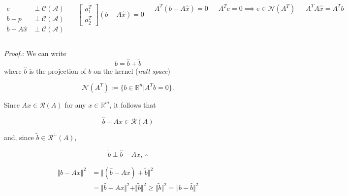 \documentclass[aspectratio=169]{beamer}
\newcommand{\incfig}[2][1]{%
    \def\svgwidth{#1\columnwidth}
    {#2.pdf_tex} }
\begin{document}
\begin{frame} %
	\begin{columns}
	
	\begin{align*}
		e &\perp \mathcal{C(A)} \\
		b- p & \perp \mathcal{C(A)} \\
		b- A \hat{x} & \perp \mathcal{C(A)}
	\end{align*}
	
	\begin{equation*}
		\begin{bmatrix} a_1^T \\ a_2^T\end{bmatrix} \left(b - A \hat{x} \right) = 0
	\end{equation*}

	\begin{equation*}
		A^T \left(b - A \hat{x} \right) = 0
	\end{equation*}
	
	\begin{equation*}	
		A^T e = 0 \implies e \in \mathcal{N}(A^T)
	\end{equation*}	

	\begin{equation*}
		A^T A \hat{x} = A^T b
	\end{equation*}


\begin{figure}[ht]
    \centering
    \incfig{mainissue}
    \label{fig:minhatx}
\end{figure}

	\end{columns}
\end{frame}

\begin{frame}{}  %
	
	{\color{violet} \textit{Proof.}:} We can write
		\[ b = \hat{b} + \tilde{b} \]
		\noindent where $\hat{b}$ is the projection of $b$ on the kernel (\textit{null space})
		
		\[\mathcal{N}(A^T) := \{ b\in \mathbb{R}^n | A^T b = 0  \}. \]
		
		Since $Ax \in \mathcal{R}(A) $ for any $x \in \mathbb{R}^m$, it follows that
		
		\[ \hat{b} - Ax \in \mathcal{R}(A) \]
		
		\noindent and, since $\tilde{b} \in \mathcal{R^\perp}(A)$,
		
		\[ \tilde{b} \perp  \hat{b} - Ax, \, \therefore  \]
		

		\begin{align*}
		\Vert b- Ax \Vert^2 &= \Vert (\hat{b}- Ax) + \tilde{b} \Vert^2\\
		&=\Vert \hat{b}- Ax  \Vert^2 + \Vert \tilde{b} \Vert^2 \geq \Vert \tilde{b} \Vert^2 = \Vert b - \hat{b} \Vert^2
		\end{align*}
\end{frame}
\end{document}
